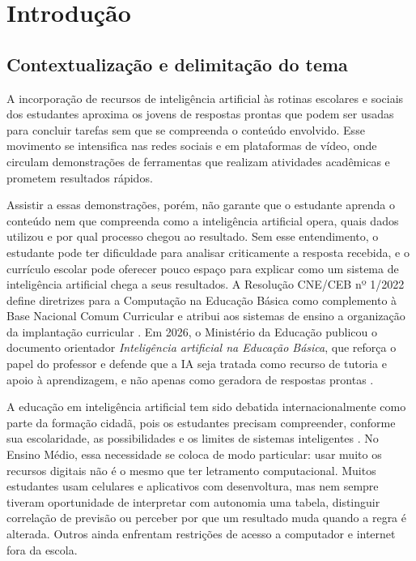 \chapter{Introdução}

\section{Contextualização e delimitação do tema}

A incorporação de recursos de inteligência artificial às rotinas escolares e sociais dos estudantes aproxima os jovens de respostas prontas que podem ser usadas para concluir tarefas sem que se compreenda o conteúdo envolvido. Esse movimento se intensifica nas redes sociais e em plataformas de vídeo, onde circulam demonstrações de ferramentas que realizam atividades acadêmicas e prometem resultados rápidos.

Assistir a essas demonstrações, porém, não garante que o estudante aprenda o conteúdo nem que compreenda como a inteligência artificial opera, quais dados utilizou e por qual processo chegou ao resultado. Sem esse entendimento, o estudante pode ter dificuldade para analisar criticamente a resposta recebida, e o currículo escolar pode oferecer pouco espaço para explicar como um sistema de inteligência artificial chega a seus resultados. A Resolução CNE/CEB nº 1/2022 define diretrizes para a Computação na Educação Básica como complemento à Base Nacional Comum Curricular e atribui aos sistemas de ensino a organização da implantação curricular \cite{brasil2022computacao}. Em 2026, o Ministério da Educação publicou o documento orientador \textit{Inteligência artificial na Educação Básica}, que reforça o papel do professor e defende que a IA seja tratada como recurso de tutoria e apoio à aprendizagem, e não apenas como geradora de respostas prontas \cite{brasil2026iaeducacaobasica}.

A educação em inteligência artificial tem sido debatida internacionalmente como parte da formação cidadã, pois os estudantes precisam compreender, conforme sua escolaridade, as possibilidades e os limites de sistemas inteligentes \cite{touretzky2019envisioning}. No Ensino Médio, essa necessidade se coloca de modo particular: usar muito os recursos digitais não é o mesmo que ter letramento computacional. Muitos estudantes usam celulares e aplicativos com desenvoltura, mas nem sempre tiveram oportunidade de interpretar com autonomia uma tabela, distinguir correlação de previsão ou perceber por que um resultado muda quando a regra é alterada. Outros ainda enfrentam restrições de acesso a computador e internet fora da escola.

